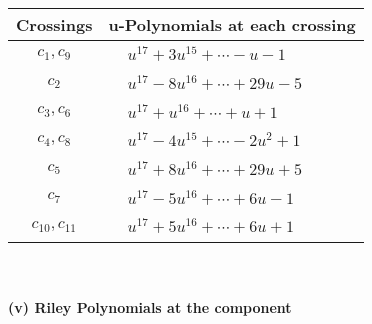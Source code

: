 \documentclass[1p]{elsarticle_modified}
\theoremstyle{definition}
\begin{document}
\begin{tabular}{m{50pt}|m{274pt}}
Crossings & \hspace{64pt}u-Polynomials at each crossing \\
\hline $$\begin{aligned}c_{1},c_{9}\end{aligned}$$&$\begin{aligned}
&u^{17}+3 u^{15}+\cdots- u-1
\end{aligned}$\\
\hline $$\begin{aligned}c_{2}\end{aligned}$$&$\begin{aligned}
&u^{17}-8 u^{16}+\cdots+29 u-5
\end{aligned}$\\
\hline $$\begin{aligned}c_{3},c_{6}\end{aligned}$$&$\begin{aligned}
&u^{17}+u^{16}+\cdots+u+1
\end{aligned}$\\
\hline $$\begin{aligned}c_{4},c_{8}\end{aligned}$$&$\begin{aligned}
&u^{17}-4 u^{15}+\cdots-2 u^2+1
\end{aligned}$\\
\hline $$\begin{aligned}c_{5}\end{aligned}$$&$\begin{aligned}
&u^{17}+8 u^{16}+\cdots+29 u+5
\end{aligned}$\\
\hline $$\begin{aligned}c_{7}\end{aligned}$$&$\begin{aligned}
&u^{17}-5 u^{16}+\cdots+6 u-1
\end{aligned}$\\
\hline $$\begin{aligned}c_{10},c_{11}\end{aligned}$$&$\begin{aligned}
&u^{17}+5 u^{16}+\cdots+6 u+1
\end{aligned}$\\
\hline
\end{tabular}\\~\\
\newpage\renewcommand{\arraystretch}{1}
\flushleft \textbf{(v) Riley Polynomials at the component}\newline \\
\end{document}
